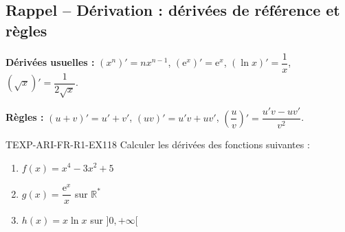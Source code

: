 

\subsection*{Rappel -- Dérivation : dérivées de référence et règles}

\textbf{Dérivées usuelles :} $(x^n)' = n x^{n-1}$, $(\mathrm{e}^x)' = \mathrm{e}^x$, $(\ln x)' = \dfrac{1}{x}$, $(\sqrt{x})' = \dfrac{1}{2\sqrt{x}}$.

\textbf{Règles :} $(u+v)' = u' + v'$, $(uv)' = u'v + uv'$, $\left(\dfrac{u}{v}\right)' = \dfrac{u'v - uv'}{v^2}$.

\begin{exercice}{TEXP-ARI-FR-R1-EX1}{1}{8}
Calculer les dérivées des fonctions suivantes :
\begin{enumerate}
  \item $f(x) = x^4 - 3x^2 + 5$
  \item $g(x) = \dfrac{\mathrm{e}^x}{x}$ sur $\mathbb{R}^*$
  \item $h(x) = x \ln x$ sur $]0, +\infty[$
\end{enumerate}
\end{exercice}

